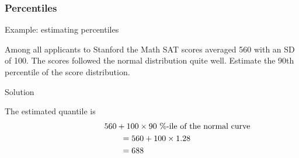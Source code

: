 \documentclass[handout]{beamer}
\begin{document}
   \begin{frame} \frametitle{Percentiles}

   \begin{block}
   {Example: estimating percentiles}

   Among all applicants to Stanford the Math SAT scores averaged 560 with
   an SD of 100. The scores followed the normal distribution
   quite well. Estimate the 90th percentile of the score distribution.

   \end{block}

   \begin{block}
     {Solution}

   The estimated quantile is
   $$
   \begin{aligned}
   \lefteqn{560 + 100 \times \text{90 \%-ile of the normal curve}} \\
   & \qquad =  560 + 100 \times 1.28 \\
   & \qquad = 688
   \end{aligned}
   $$
   \end{block}
   \end{frame}


   \begin{frame} 

   \end{frame}

   
\end{document}
